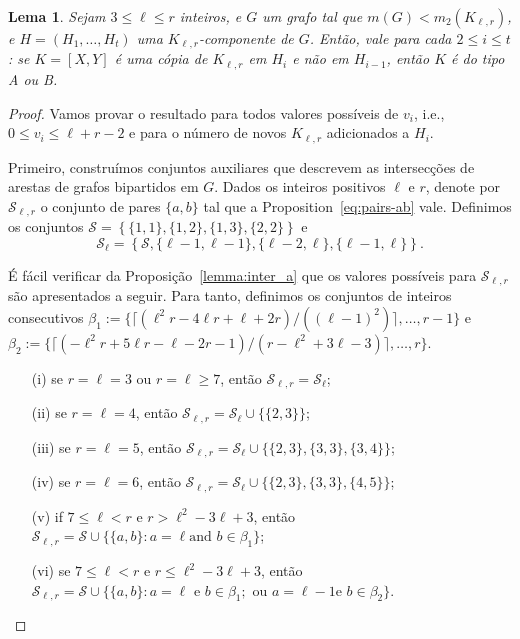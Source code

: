 \documentclass[11pt,twoside,a4paper]{book}
\newcommand{\K}{K_{\ell,r}} %
\newtheorem{lema}      [teorema] {Lema}
\theoremstyle{note}
\begin{document}
  
 \begin{lema}\label{lema:config}
        Sejam $3\leq \ell \leq r$ inteiros, e $G$ um grafo tal que $m(G) < m_2(\K)$, 
     e $H = (H_1, \ldots, H_t)$ uma $\K$-componente de $G$.  
    Então,  vale para cada $2\leq i \leq t$: 
    se $K = [X, Y]$ é uma cópia de $\K$ em
    $H_i$ e não em $H_{i-1}$, 
    então $K$ é do tipo A ou B.   
    \end{lema}
\begin{proof}
        Vamos provar o resultado para todos valores possíveis de $v_i$, i.e., $0\leq v_i \leq \ell+r-2$ e para o número de novos $\K$ adicionados a $H_i$.
       
    Primeiro, construímos conjuntos auxiliares que descrevem as intersecções de arestas de grafos bipartidos em $G$.   
    Dados os inteiros positivos $\ell$ e $r$, denote por
    $\mathcal{S}_{\ell,r}$ o conjunto de pares $\{a,b\}$ tal que a Proposition~\ref{eq:pairs-ab} vale.  
    Definimos os conjuntos $\mathcal{S} = \left\{\{1,1\},\{1,2\},\{1,3\},\{2,2\}\right\}$ e
    \begin{equation*} 
    	\mathcal{S}_\ell =
    \left\{\mathcal{S},\{\ell-1,\ell-1\},\{\ell-2,\ell\},\{\ell-1,\ell\}\right\}.
    \end{equation*} 
    
    É fácil verificar da Proposição~\ref{lemma:inter_a} que os valores possíveis para $\mathcal{S}_{\ell,r}$ são apresentados a seguir.
     Para tanto, definimos os conjuntos de inteiros consecutivos 
     $\beta_1:=\{\lceil (\ell^2r - 4\ell r +
    \ell+2r)/((\ell-1)^2)\rceil,\dots, r-1\}$ 
    e
    $\beta_2:=\{\lceil
    (-\ell^2r +5\ell r - \ell-2r-1)/(r-\ell^2+3\ell-3)\rceil,\ldots, r\}$.
    
      \begin{itemize}
      \item [(i)] se $r=\ell = 3$ ou $r=\ell \geq 7$, então
    $\mathcal{S}_{\ell,r} = \mathcal{S}_\ell$;
      \item [(ii)] se $r=\ell = 4$, então $\mathcal{S}_{\ell,r} =
    \mathcal{S}_\ell \cup\big\{\{2,3\}\big\}$;
      \item [(iii)] se $r=\ell = 5$, então $\mathcal{S}_{\ell,r} =
    \mathcal{S}_\ell \cup\big\{\{2,3\},\{3,3\},\{3,4\}\big\}$;
      \item [(iv)] se $r=\ell = 6$, então $\mathcal{S}_{\ell,r} =
    \mathcal{S}_\ell \cup\big\{\{2,3\},\{3,3\},\{4,5\}\big\}$;
      \item[(v)] if $7 \leq \ell < r \text{ e } r > \ell^2-3\ell+3$,
    então $\mathcal{S}_{\ell,r} = \mathcal{S} \cup \{\{a,b\}: a=\ell\text{
    and }b\in \beta_1\}$;
       \item[(vi)] se $7 \leq \ell < r \text{ e } r \leq
    \ell^2-3\ell+3$, então $\mathcal{S}_{\ell,r} = \mathcal{S} \cup
    \{\{a,b\}: a=\ell\text{ e }b\in \beta_1;\text{ ou }a=\ell-1\text{
    e }b\in \beta_2\}$.
      \end{itemize}


\end{proof}
\end{document}
